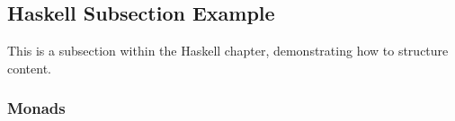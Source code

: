 
\subsection{Haskell Subsection Example}

This is a subsection within the Haskell chapter, demonstrating how to structure content.

\subsubsection{Monads}
\lipsum[8]
